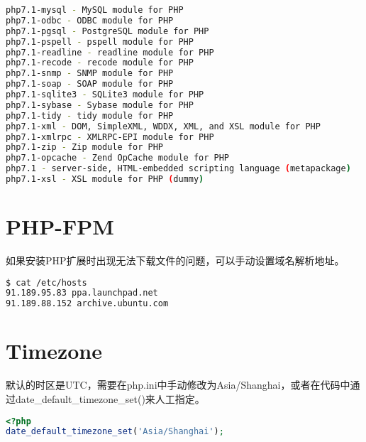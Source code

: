 \begin{lstlisting}[language=bash]
php7.1-mysql - MySQL module for PHP
php7.1-odbc - ODBC module for PHP
php7.1-pgsql - PostgreSQL module for PHP
php7.1-pspell - pspell module for PHP
php7.1-readline - readline module for PHP
php7.1-recode - recode module for PHP
php7.1-snmp - SNMP module for PHP
php7.1-soap - SOAP module for PHP
php7.1-sqlite3 - SQLite3 module for PHP
php7.1-sybase - Sybase module for PHP
php7.1-tidy - tidy module for PHP
php7.1-xml - DOM, SimpleXML, WDDX, XML, and XSL module for PHP
php7.1-xmlrpc - XMLRPC-EPI module for PHP
php7.1-zip - Zip module for PHP
php7.1-opcache - Zend OpCache module for PHP
php7.1 - server-side, HTML-embedded scripting language (metapackage)
php7.1-xsl - XSL module for PHP (dummy)
\end{lstlisting}

\section{PHP-FPM}

如果安装PHP扩展时出现无法下载文件的问题，可以手动设置域名解析地址。

\begin{lstlisting}[language=bash]
$ cat /etc/hosts
91.189.95.83 ppa.launchpad.net
91.189.88.152 archive.ubuntu.com
\end{lstlisting}

\section{Timezone}


默认的时区是UTC，需要在php.ini中手动修改为Asia/Shanghai，或者在代码中通过date\_default\_timezone\_set()来人工指定。

\begin{lstlisting}[language=PHP]
<?php
date_default_timezone_set('Asia/Shanghai');
\end{lstlisting}